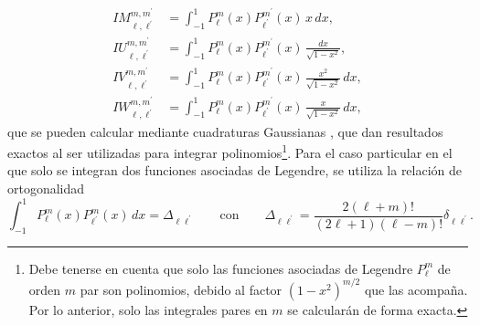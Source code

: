 \begin{align}
IM_{\ell,\ell^{\prime}}^{m,m^{\prime}} &=\int_{-1}^1 P_{\ell}^{m}(x) P_{\ell^{\prime}}^{m^{\prime}}(x) \,x \, dx, \\
IU_{\ell,\ell^{\prime}}^{m,m^{\prime}} &=\int_{-1}^1 P_{\ell}^{m}(x) P_{\ell^{\prime}}^{m^{\prime}}(x) \, \frac{dx}{\sqrt{1-x^2}}, \\
IV_{\ell,\ell^{\prime}}^{m,m^{\prime}} &=\int_{-1}^1 P_{\ell}^{m}(x) P_{\ell^{\prime}}^{m^{\prime}}(x) \, \frac{x^2}{\sqrt{1-x^2}} \, dx, \\
IW_{\ell,\ell^{\prime}}^{m,m^{\prime}} &=\int_{-1}^1 P_{\ell}^{m}(x) P_{\ell^{\prime}}^{m^{\prime}}(x) \, \frac{x}{\sqrt{1-x^2}} \, dx, 
\end{align}
que se pueden calcular mediante cuadraturas Gaussianas \cite{kahaner1989numerical}, que dan resultados exactos al ser utilizadas para integrar polinomios\footnote{Debe tenerse en cuenta que solo las funciones asociadas de Legendre $P_{\ell}^m$ de orden $m$ par son polinomios, debido al factor $(1-x^2)^{m/2}$ que las acompaña. Por lo anterior, solo las integrales pares en $m$ se calcularán de forma exacta.}. Para el caso particular en el que solo se integran dos funciones asociadas de Legendre, se utiliza la relación de ortogonalidad \cite{Abramowitz}
\begin{equation}
\int_{-1}^{1} P_{\ell}^{m}(x) P_{\ell^{\prime}}^{m}(x) \, dx = \Delta_{\ell \ell^{\prime}} \qquad \text{con} \qquad \Delta_{\ell \ell^{\prime}}= \frac{2(\ell+m)!}{(2\ell+1)(\ell-m)!} \delta_{\ell \ell^{\prime}}.
\end{equation}

